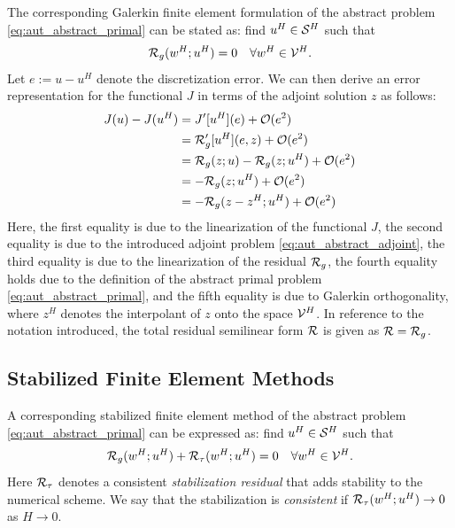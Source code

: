 The corresponding Galerkin finite element formulation of the abstract
problem \eqref{eq:aut_abstract_primal} can be stated as: find
$u^H \in \S^H$ such that
%
\begin{gather}
\R_g(w^H; u^H) = 0 \quad \forall w^H \in \V^H.
\label{eq:aut_abstract_fem}
\end{gather}
%
Let $e := u-u^H$ denote the discretization error. We can then derive an
error representation for the functional $J$ in terms of the adjoint solution
$z$ as follows:
%
\begin{gather}
\begin{aligned}
J(u) - J(u^H) &= J'[u^H](e) + \O(e^2) \\
&= \R_g'[u^H](e, z) + \O(e^2) \\
&= \R_g(z; u) - \R_g(z; u^H) + \O(e^2) \\
&= - \R_g(z; u^H) + \O(e^2) \\
&= - \R_g(z - z^H; u^H) + \O(e^2)
\end{aligned}
\label{eq:aut_abstract_galerkin_error}
\end{gather}
%
Here, the first equality is due to the linearization \cite{becker2001optimal}
of the functional $J$, the second equality is due to the introduced adjoint
problem \eqref{eq:aut_abstract_adjoint}, the third equality is due to the
linearization \cite{becker2001optimal} of the residual $\R_g$, the fourth
equality holds due to the definition of the abstract primal problem
\eqref{eq:aut_abstract_primal}, and the fifth equality is due to Galerkin
orthogonality, where $z^H$ denotes the interpolant of $z$ onto the space
$\V^H$. In reference to the notation introduced, the
total residual semilinear form $\R$ is given as $\R = \R_g$.

\subsection{Stabilized Finite Element Methods}

A corresponding stabilized finite element method of the abstract problem
\eqref{eq:aut_abstract_primal} can be expressed as: find $u^H \in \S^H$ such
that
%
\begin{gather}
\R_g(w^H; u^H) + \R_{\tau}(w^H; u^H) = 0 \quad \forall w^H \in \V^H.
\label{eq:aut_abstract_stabilized_fem}
\end{gather}
%
Here $\R_{\tau}$ denotes a consistent \emph{stabilization residual} that adds
stability to the numerical scheme. We say that the
stabilization is \emph{consistent} if $\R_{\tau}(w^H ; u^H) \to 0$ as
$H \to 0$.

